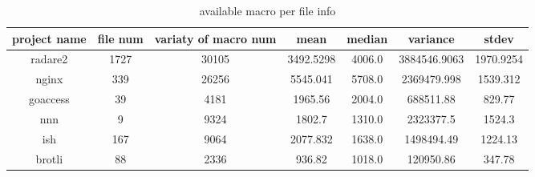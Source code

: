 \begin{table}[h]
	\caption{available macro per file info}
	\label{table:available_macro_info}	
		\begin{tabular}{ccccccc}
		\hline
		project name & file num & variaty of macro num & mean & median & variance & stdev \\ 
		\hline \hline
		radare2 & 1727 & 30105 & 3492.5298 & 4006.0 & 3884546.9063 & 1970.9254 \\ 
		\hline
		nginx & 339 & 26256 & 5545.041 & 5708.0 & 2369479.998 & 1539.312 \\ 
		\hline
		goaccess & 39 & 4181 & 1965.56 & 2004.0 & 688511.88 & 829.77 \\ 
		\hline
		nnn & 9 & 9324 & 1802.7 & 1310.0 & 2323377.5 & 1524.3 \\ 
		\hline
		ish & 167 & 9064 & 2077.832 & 1638.0 & 1498494.49 & 1224.13 \\ 
		\hline
		brotli & 88 & 2336 & 936.82 & 1018.0 & 120950.86 & 347.78 \\ 
		\hline
	\end{tabular}
\end{table}